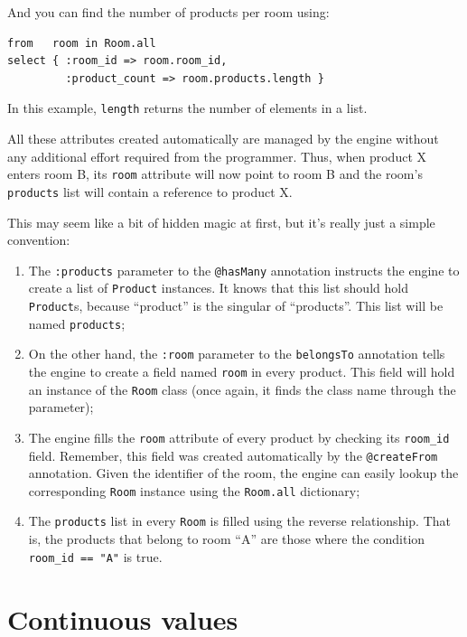 \documentclass{report}
\begin{document}
And you can find the number of products per room using:

\begin{verbatim}
from   room in Room.all
select { :room_id => room.room_id,
         :product_count => room.products.length }
\end{verbatim}

In this example, \verb=length= returns the number of elements in a
list.

All these attributes created automatically are managed by the engine
without any additional effort required from the programmer. Thus, when
product X enters room B, its \verb=room= attribute will now point to
room B and the room's \verb=products= list will contain a reference to
product X.

This may seem like a bit of hidden magic at first, but it's really
just a simple convention:

\begin{enumerate}
\item The \verb=:products= parameter to the \verb=@hasMany= annotation
  instructs the engine to create a list of \verb=Product=
  instances. It knows that this list should hold \verb=Product=s,
  because ``product'' is the singular of ``products''. This list will
  be named \verb=products=;
\item On the other hand, the \verb=:room= parameter to the
  \verb=belongsTo= annotation tells the engine to create a field named
  \verb=room= in every product. This field will hold an instance of the
  \verb=Room= class (once again, it finds the class name through the
  parameter);
\item The engine fills the \verb=room= attribute of every product by
  checking its \verb=room_id= field. Remember, this field was created
  automatically by the \verb=@createFrom= annotation. Given the
  identifier of the room, the engine can easily lookup the
  corresponding \verb=Room= instance using the \verb=Room.all=
  dictionary;
\item The \verb=products= list in every \verb=Room= is filled using
  the reverse relationship. That is, the products that belong to room
  ``A'' are those where the condition \verb!room_id == "A"! is true.
\end{enumerate}

\section{Continuous values}
\label{sec:continuous-values}
\end{document}
